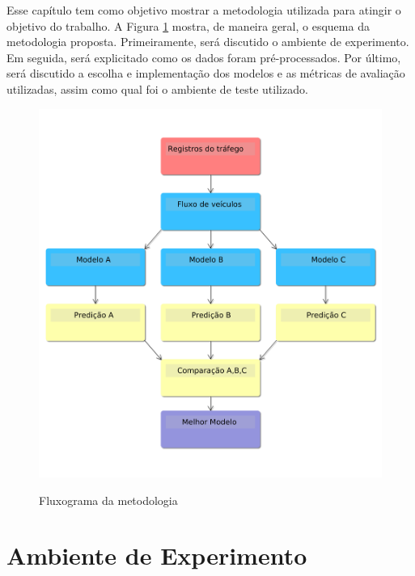 
Esse capítulo tem como objetivo mostrar a metodologia utilizada para atingir o objetivo do trabalho. A Figura \ref{figure:metodologia} mostra, de maneira geral, o esquema da metodologia proposta. Primeiramente, será discutido o ambiente de experimento. Em seguida, será explicitado como os dados foram pré-processados. Por último, será discutido a escolha e implementação dos modelos e as métricas de avaliação utilizadas, assim como qual foi o ambiente de teste utilizado.

\begin{figure}
    \centering
    \includegraphics[scale=0.4]{monography/img/tccFlux.png}
    \label{figure:metodologia}
    \caption[Fluxograma da metodologia]{Fluxograma da metodologia}
\end{figure}

\section{Ambiente de Experimento}

